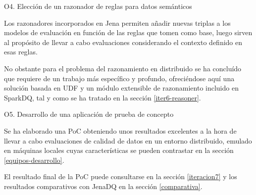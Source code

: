 \begin{definitionlist}
\item [O4. Elección de un razonador de reglas para datos semánticos]

Los razonadores incorporados en Jena permiten añadir nuevas triplas a los
modelos de evaluación en función de las reglas que tomen como base, luego sirven
al propósito de llevar a cabo evaluaciones considerando el contexto definido en
esas reglas. 

No obstante para el problema del razonamiento en distribuido se ha concluído que
requiere de un trabajo más específico y profundo, ofreciéndose aquí una solución
basada en \acf{UDF} y un módulo extensible de razonamiento incluido en SparkDQ,
tal y como se ha tratado en la sección \ref{iter6-reasoner}. 

\item [O5. Desarrollo de una aplicación de prueba de concepto]

Se ha elaborado una \acs{PoC} obteniendo unos resultados excelentes a la hora de
llevar a cabo evaluaciones de calidad de datos en un entorno distribuido,
emulado en máquinas locales cuyas características se pueden contrastar en la
sección \ref{equipos-desarrollo}.

El resultado final de la \acs{PoC} puede consultarse en la sección \ref{iteracion7} y los resultados
comparativos con JenaDQ en la sección \ref{comparativa}. 

\end{definitionlist}

